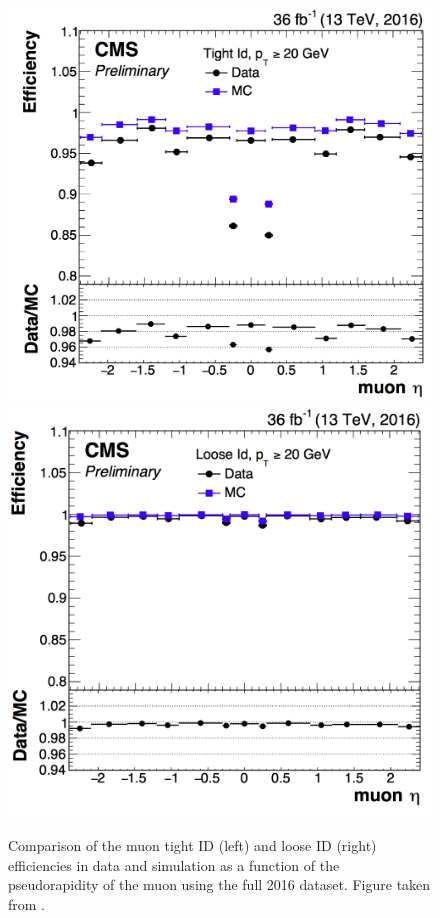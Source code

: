 \begin{figure}[htbp]
	\centering
	\includegraphics[width=0.495\linewidth]{4_EventRecoSelect/Figures/TightIDvseta}
	\includegraphics[width=0.495\linewidth]{4_EventRecoSelect/Figures/LooseIDvseta}
	\caption{Comparison of the muon tight ID (left) and loose ID (right) efficiencies in data and simulation as a function of the pseudorapidity of the muon using the full 2016 dataset. Figure taken from \cite{CMS-DP-2017-007}.}
	\label{fig:tightid}
\end{figure}

